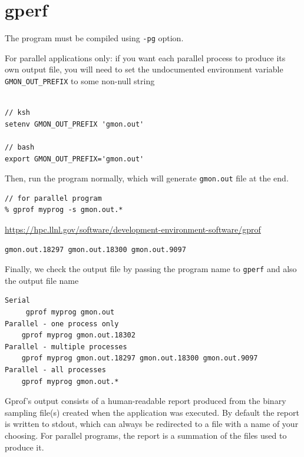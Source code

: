 \section{gperf}
\label{sec:gperf}

The program must be compiled using \verb!-pg! option. 

For parallel applications only: if you want each parallel process to produce its
own output file, you will need to set the undocumented environment variable
\verb!GMON_OUT_PREFIX! to some non-null string

\begin{verbatim}

// ksh
setenv GMON_OUT_PREFIX 'gmon.out'

// bash
export GMON_OUT_PREFIX='gmon.out'
\end{verbatim}


Then, run the program normally, which will generate \verb!gmon.out! file at the end.

\begin{verbatim}
// for parallel program
% gprof myprog -s gmon.out.*
\end{verbatim}
\url{https://hpc.llnl.gov/software/development-environment-software/gprof}

\begin{verbatim}
gmon.out.18297 gmon.out.18300 gmon.out.9097
\end{verbatim}

Finally, we check the output file by passing the program name to \verb!gperf! and also the output file name

\begin{verbatim}
Serial
	 gprof myprog gmon.out
Parallel - one process only
	gprof myprog gmon.out.18302
Parallel - multiple processes
	gprof myprog gmon.out.18297 gmon.out.18300 gmon.out.9097
Parallel - all processes
	gprof myprog gmon.out.* 

\end{verbatim}


Gprof's output consists of a human-readable report produced from the binary
sampling file(s) created when the application was executed. By default the
report is written to stdout, which can always be redirected to a file with a
name of your choosing. For parallel programs, the report is a summation of the
files used to produce it.

